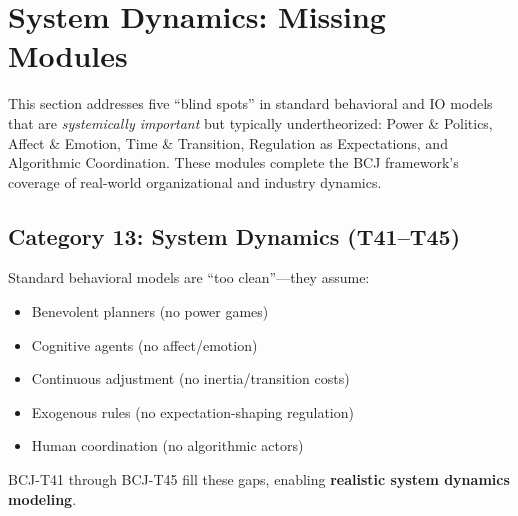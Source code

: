 
\section{System Dynamics: Missing Modules}
\label{sec:bcj-system-dynamics}

This section addresses five ``blind spots'' in standard behavioral and IO models that are \textit{systemically important} but typically undertheorized: Power \& Politics, Affect \& Emotion, Time \& Transition, Regulation as Expectations, and Algorithmic Coordination. These modules complete the BCJ framework's coverage of real-world organizational and industry dynamics.

\subsection{Category 13: System Dynamics (T41--T45)}

\begin{tcolorbox}[colback=red!5!white, colframe=red!75!black,
    title=The Five Missing Modules]
Standard behavioral models are ``too clean''---they assume:
\begin{itemize}[nosep]
\item Benevolent planners (no power games)
\item Cognitive agents (no affect/emotion)
\item Continuous adjustment (no inertia/transition costs)
\item Exogenous rules (no expectation-shaping regulation)
\item Human coordination (no algorithmic actors)
\end{itemize}

BCJ-T41 through BCJ-T45 fill these gaps, enabling \textbf{realistic system dynamics modeling}.
\end{tcolorbox}

